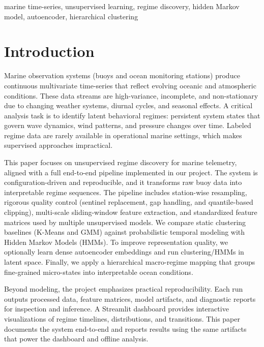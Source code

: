 \documentclass[conference]{IEEEtran}
\begin{document}
\begin{IEEEkeywords}
marine time-series, unsupervised learning, regime discovery, hidden Markov model, autoencoder, hierarchical clustering
\end{IEEEkeywords}

\section{Introduction}
Marine observation systems (buoys and ocean monitoring stations) produce continuous multivariate time-series that reflect evolving oceanic and atmospheric conditions. These data streams are high-variance, incomplete, and non-stationary due to changing weather systems, diurnal cycles, and seasonal effects. A critical analysis task is to identify latent behavioral regimes: persistent system states that govern wave dynamics, wind patterns, and pressure changes over time. Labeled regime data are rarely available in operational marine settings, which makes supervised approaches impractical.

This paper focuses on unsupervised regime discovery for marine telemetry, aligned with a full end-to-end pipeline implemented in our project. The system is configuration-driven and reproducible, and it transforms raw buoy data into interpretable regime sequences. The pipeline includes station-wise resampling, rigorous quality control (sentinel replacement, gap handling, and quantile-based clipping), multi-scale sliding-window feature extraction, and standardized feature matrices used by multiple unsupervised models. We compare static clustering baselines (K-Means and GMM) against probabilistic temporal modeling with Hidden Markov Models (HMMs). To improve representation quality, we optionally learn dense autoencoder embeddings and run clustering/HMMs in latent space. Finally, we apply a hierarchical macro-regime mapping that groups fine-grained micro-states into interpretable ocean conditions.

Beyond modeling, the project emphasizes practical reproducibility. Each run outputs processed data, feature matrices, model artifacts, and diagnostic reports for inspection and inference. A Streamlit dashboard provides interactive visualizations of regime timelines, distributions, and transitions. This paper documents the system end-to-end and reports results using the same artifacts that power the dashboard and offline analysis.
\end{document}
